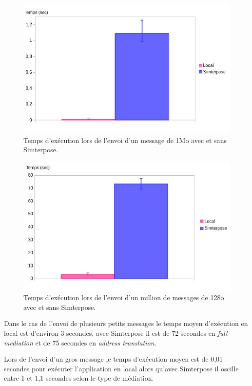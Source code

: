 \begin{figure}[H]
  \centering
    \includegraphics[scale=0.5]{mesures/graph/Bigmsg_local.jpg}
    \caption{Temps d'exécution lors de l'envoi d'un message de 1Mo avec et sans Simterpose.}
    \label{Network_Big_Local}
\end{figure}

\begin{figure}
  \centering
    \includegraphics[scale=0.5]{mesures/graph/Littlemsg_local.jpg}
    \caption{Temps d'exécution lors de l'envoi d'un million de messages de 128o avec et sans Simterpose.}
    \label{Network_Little_Local}
\end{figure}

Dans le cas de l'envoi de plusieurs petits messages le temps moyen d'exécution en local est d'environ 3 secondes, avec Simterpose il est de 72 secondes en \textit{full mediation} et de 75 secondes en \textit{address translation}.

Lors de l'envoi d'un gros message le temps d'exécution moyen est de 0,01 secondes pour exécuter l'application en local alors qu'avec Simterpose il oscille entre 1 et 1,1 secondes selon le type de médiation.

